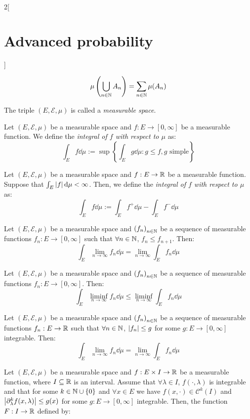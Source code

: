 \documentclass[../../../main_math.tex]{subfiles}
\begin{document}
\begin{multicols}{2}[\section{Advanced probability}]
\begin{definition}[Measure]
\begin{enumerate}
            $$
              \mu\left(\bigcup_{n\in\mathbb{N}}{A_n}\right)=\sum_{n\in\mathbb{N}}{\mu(A_n)}
            $$
    \end{enumerate}
    The triple $(E,\mathcal{E},\mu)$ is called a \emph{measurable space}.
  \end{definition}
  \begin{definition}
    Let $(E,\mathcal{E},\mu)$ be a measurable space and $f:E\to [0,\infty]$ be a measurable function. We define the \emph{integral of $f$ with respect to $\mu$} as:
    $$
      \int_E{f\dd{\mu}}:=\sup\left\{\int_E{g\dd{\mu}}:g\leq f, g\text{ simple}\right\}
    $$
  \end{definition}
  \begin{definition}
    Let $(E,\mathcal{E},\mu)$ be a measurable space and $f:E\to \mathbb{R}$ be a measurable function. Suppose that $\int_E{\abs{f}\dd{\mu}}<\infty$. Then, we define the \emph{integral of $f$ with respect to $\mu$} as:
    $$
      \int_E{f\dd{\mu}}:=\int_E{f^+\dd{\mu}}-\int_E{f^-\dd{\mu}}
    $$
  \end{definition}
  \begin{theorem}
    Let $(E,\mathcal{E},\mu)$ be a measurable space and ${(f_n)}_{n\in\mathbb{N}}$ be a sequence of measurable functions $f_n:E\to [0,\infty]$ such that $\forall n\in\mathbb{N}$, $f_n\leq f_{n+1}$. Then:
    $$
      \int_E{\lim_{n\to\infty}{f_n}\dd{\mu}}=\lim_{n\to\infty}{\int_E{f_n\dd{\mu}}}
    $$
  \end{theorem}
  \begin{theorem}
    Let $(E,\mathcal{E},\mu)$ be a measurable space and ${(f_n)}_{n\in\mathbb{N}}$ be a sequence of measurable functions $f_n:E\to [0,\infty]$. Then:
    $$
      \int_E{\liminf_{n\to\infty}{f_n}\dd{\mu}}\leq \liminf_{n\to\infty}{\int_E{f_n\dd{\mu}}}
    $$
  \end{theorem}
  \begin{theorem}
    Let $(E,\mathcal{E},\mu)$ be a measurable space and ${(f_n)}_{n\in\mathbb{N}}$ be a sequence of measurable functions $f_n:E\to \mathbb{R}$ such that $\forall n\in\mathbb{N}$, $\abs{f_n}\leq g$ for some $g:E\to [0,\infty]$ integrable. Then:
    $$
      \int_E{\lim_{n\to\infty}{f_n}\dd{\mu}}=\lim_{n\to\infty}{\int_E{f_n\dd{\mu}}}
    $$
  \end{theorem}
  \begin{proposition}
    Let $(E,\mathcal{E},\mu)$ be a measurable space and $f:E\times I\rightarrow \mathbb{R}$ be a measurable function, where $I\subseteq \mathbb{R}$ is an interval. Assume that $\forall \lambda\in I$, $f(\cdot,\lambda)$ is integrable and that for some $k\in \mathbb{N}\cup\{0\}$ and $\forall x\in E$ we have $f(x,\cdot)\in \mathcal{C}^k(I)$ and $\abs{\partial_\lambda^k f(x,\lambda)}\leq g(x)$ for some $g:E\to [0,\infty]$ integrable. Then, the function $F:I\to \mathbb{R}$ defined by:

\end{proposition}
\end{multicols}
\end{document}
